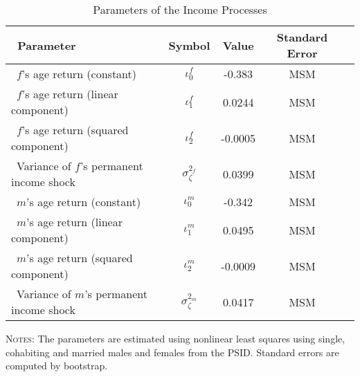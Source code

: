 \documentclass[12pt]{article}
\numberwithin{table}{section}
\begin{document}
\begin{table}[H]
\caption{\\Parameters of the Income Processes} %
\centering %
\begin{threeparttable}
\begin{tabular}{@{\extracolsep{5pt}}lcccc}   %
\hline \hline%
\ Parameter & Symbol  & Value &   Standard Error\\ [0.45ex] %
\hline
\ $f$'s age return (constant)         & $\iota^f_0$  & -0.383 & MSM & \\[0.45ex]
\ $f$'s age return (linear component) & $\iota^f_1$         & 0.0244  & MSM & \\[0.45ex]
\ $f$'s age return (squared component)               & $\iota^f_2$       & -0.0005 & MSM & \\[0.45ex]
\ Variance of $f$'s permanent income shock                                 & $\sigma_\zeta^{2_f}$             & 0.0399  & MSM & \\[0.45ex]
\ $m$'s age return (constant)         & $\iota^m_0$  & -0.342 & MSM & \\[0.45ex]
\ $m$'s age return (linear component) & $\iota^m_1$         & 0.0495  & MSM & \\[0.45ex]
\ $m$'s age return (squared component)               & $\iota^m_2$       & -0.0009 & MSM & \\[0.45ex]
\ Variance of $m$'s permanent income shock                                 & $\sigma_\zeta^{2_m}$             & 0.0417  & MSM & \\[0.45ex]
\hline
\end{tabular}
\begin{tablenotes}[flushleft]
\footnotesize{\item \textsc{Notes}: The parameters are estimated using nonlinear least squares using single, cohabiting and married males and females from the PSID. Standard errors are computed by bootstrap.}
\end{tablenotes}
\end{threeparttable}
\label{table:income_params}
\end{table}
\FloatBarrier
\end{document}
